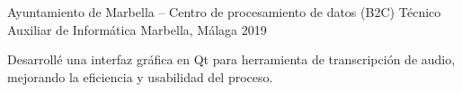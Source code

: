 \begin{cventries}
    \cventry
    {Ayuntamiento de Marbella – Centro de procesamiento de datos (B2C)}
    {Técnico Auxiliar de Informática}
    {Marbella, Málaga}
    {2019}
    {
    \begin{cvitems}
        \item{Desarrollé una interfaz gráfica en Qt para herramienta de transcripción de audio, mejorando la eficiencia y usabilidad del proceso.}
    \end{cvitems}
    }

\end{cventries}

